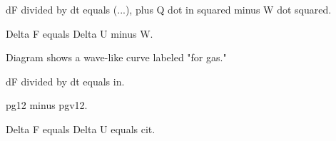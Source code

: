 dF divided by dt equals (...), plus Q dot in squared minus W dot squared.  

Delta F equals Delta U minus W.  

Diagram shows a wave-like curve labeled "for gas."  

dF divided by dt equals in.  

pg12 minus pgv12.  

Delta F equals Delta U equals cit.